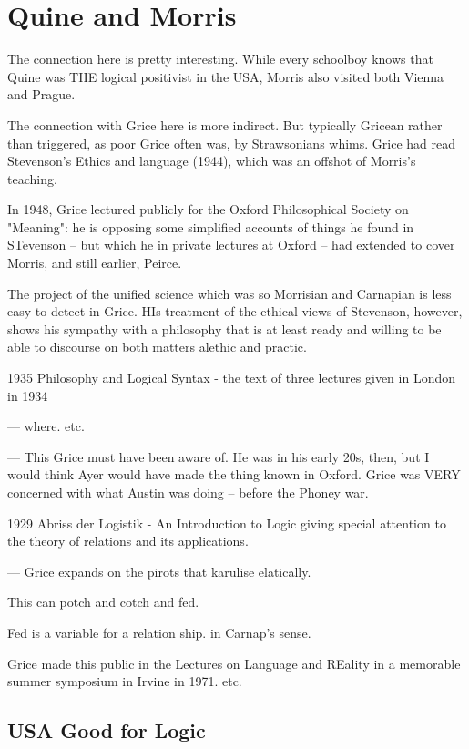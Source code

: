 \documentclass[10pt,titlepage]{book}
\begin{document}
{\section{Quine and Morris}
 
The connection here is pretty interesting.
While every schoolboy knows that Quine was THE logical positivist in the USA, Morris also visited both Vienna and Prague.
 
The connection with Grice here is more indirect.
But typically Gricean rather than triggered, as poor Grice often was, by Strawsonians whims.
Grice had read Stevenson's Ethics and language (1944), which was an offshot of Morris's teaching.

In 1948, Grice lectured publicly for the Oxford Philosophical Society  on "Meaning": he is opposing some simplified accounts of things 
he found in  STevenson -- but which he in private lectures at Oxford --  had 
extended to  cover Morris, and still earlier, Peirce.
 
The project of the unified science which was so Morrisian and  
Carnapian is less easy to detect in Grice. HIs treatment of the ethical views of Stevenson, however, shows his sympathy with a philosophy that is at least ready  and willing to be able to discourse on both matters alethic and practic.

1935 Philosophy and Logical Syntax - the text of  three lectures given in 
London in 1934  

--- where. etc.
 
---
This Grice must have been aware of. He was in his early 20s, then, but I  
would think Ayer would have made the thing known in Oxford. Grice was VERY  
concerned with what Austin was doing -- before the Phoney war.

1929 Abriss der Logistik - An Introduction to Logic giving special  
attention to the theory of relations and its applications.
 
 
--- Grice expands on the pirots that karulise elatically.
 
This can potch and cotch and fed.
 
Fed is a variable for a relation ship. in Carnap's sense.
 
Grice made this public in the Lectures on Language and REality in a  memorable summer symposium in Irvine in 1971. etc.

\subsection{USA Good for Logic}

}
\end{document}
